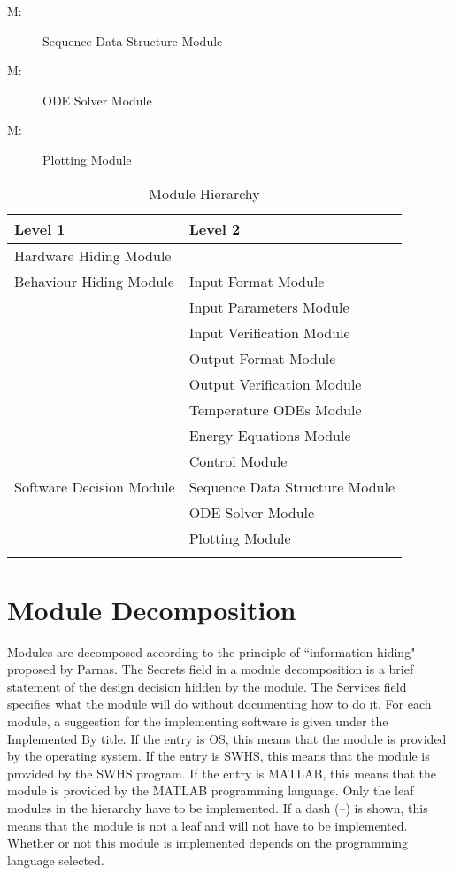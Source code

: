 \documentclass[12pt]{article}
\newcounter{modnum}
\newcommand{\mthemodnum}{M\themodnum}
\begin{document}
\begin{description}
\item[\mthemodnum\label{Mmodseqdesc}:]Sequence Data Structure Module
\end{description}
\begin{description}
\item[\mthemodnum\label{Mmododedesc}:]ODE Solver Module
\end{description}
\begin{description}
\item[\mthemodnum\label{Mmodplotdesc}:]Plotting Module
\end{description}
\begin{longtable}{l l}
\toprule
Level 1 & Level 2
\\
\midrule
Hardware Hiding Module & 
\\
Behaviour Hiding Module & Input Format Module
\\
 & Input Parameters Module
\\
 & Input Verification Module
\\
 & Output Format Module
\\
 & Output Verification Module
\\
 & Temperature ODEs Module
\\
 & Energy Equations Module
\\
 & Control Module
\\
Software Decision Module & Sequence Data Structure Module
\\
 & ODE Solver Module
\\
 & Plotting Module
\\
\bottomrule
\caption{Module Hierarchy}
\label{Table:ModuHier}
\end{longtable}
\section{Module Decomposition}
\label{Sec:ModuDeco}
Modules are decomposed according to the principle of ``information hiding" proposed by Parnas. The Secrets field in a module decomposition is a brief statement of the design decision hidden by the module. The Services field specifies what the module will do without documenting how to do it. For each module, a suggestion for the implementing software is given under the Implemented By title. If the entry is OS, this means that the module is provided by the operating system. If the entry is SWHS, this means that the module is provided by the SWHS program. If the entry is MATLAB, this means that the module is provided by the MATLAB programming language. Only the leaf modules in the hierarchy have to be implemented. If a dash (--) is shown, this means that the module is not a leaf and will not have to be implemented. Whether or not this module is implemented depends on the programming language selected.
\end{document}
